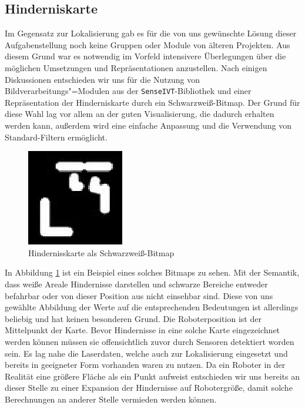 \subsection{Hinderniskarte}
\label{hinderniskarte_subsec}
\authorsection{\editorandreas}
 Im Gegensatz zur Lokalisierung gab es für die von uns gewünschte Lösung dieser
 Aufgabenstellung noch keine Gruppen oder Module von älteren Projekten. Aus
 diesem Grund war es notwendig im Vorfeld intensivere Überlegungen über die möglichen
 Umsetzungen und Repräsentationen anzustellen.
 Nach einigen Diskussionen entschieden wir uns für die Nutzung von
 Bildverarbeitungs"=Modulen aus der \lstinline{SenseIVT}-Bibliothek
 und einer Repräsentation der Hinderniskarte durch ein
 Schwarzweiß-Bitmap. Der Grund für diese Wahl lag vor
 allem an der guten Visualisierung, die dadurch erhalten werden kann, außerdem wird eine einfache
 Anpassung und die Verwendung von Standard-Filtern ermöglicht.
\begin{figure}[h]
\center
\includegraphics[scale=0.7]{graphics/hinderniskarte.jpg}
\caption{\label{fig:hinderniskarte} Hindernisskarte als Schwarzweiß-Bitmap}
\end{figure}
 In Abbildung \ref{fig:hinderniskarte} ist ein Beispiel eines solches Bitmaps
 zu sehen. Mit der Semantik, dass weiße Areale Hindernisse darstellen und schwarze Bereiche entweder befahrbar
 oder von dieser Position aus nicht einsehbar sind. Diese von uns gewählte Abbildung der Werte
 auf die entsprechenden Bedeutungen ist allerdings beliebig und hat keinen besonderen Grund.
 Die Roboterposition ist der Mittelpunkt der Karte. Bevor Hindernisse in eine solche Karte eingezeichnet werden
 können müssen sie offensichtlich zuvor durch Sensoren detektiert worden sein. Es lag nahe die Laserdaten,
 welche auch zur Lokalisierung eingesetzt und bereits in geeigneter Form vorhanden waren zu nutzen.
 Da ein Roboter in der Realität eine größere Fläche als ein Punkt aufweist entschieden wir uns bereits an dieser
 Stelle zu einer Expansion der Hindernisse auf Robotergröße, damit solche Berechnungen an anderer Stelle vermieden
 werden können.
